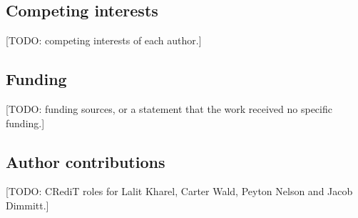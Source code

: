 \subsection*{Competing interests}
[TODO: competing interests of each author.]

\subsection*{Funding}
[TODO: funding sources, or a statement that the work received no specific funding.]

\subsection*{Author contributions}
[TODO: CRediT roles for Lalit Kharel, Carter Wald, Peyton Nelson and Jacob Dimmitt.]
